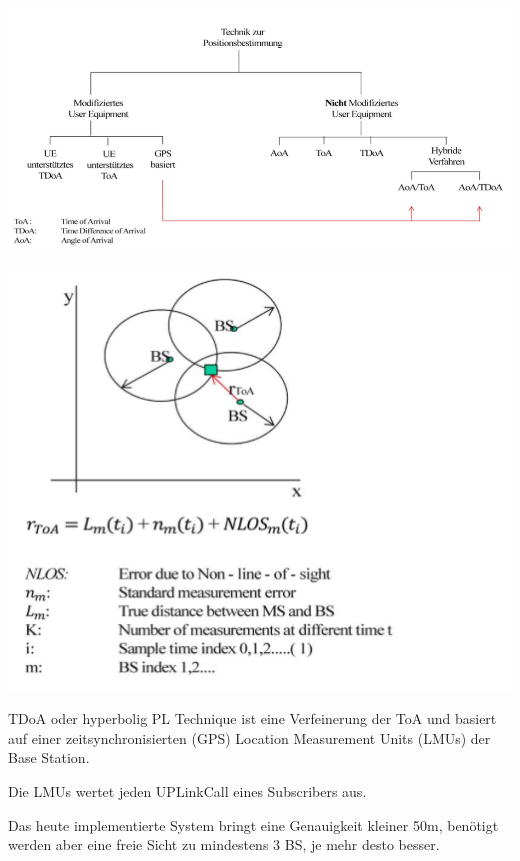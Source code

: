 \begin{minipage}{0.7 \linewidth}
\includegraphics[width =\linewidth]{./Pics/MPS}
\end{minipage}
\begin{minipage}{0.3 \linewidth}
\includegraphics[width = \linewidth]{./Pics/TDoA}
\end{minipage}

TDoA oder hyperbolig PL Technique ist eine Verfeinerung der ToA und basiert auf einer zeitsynchronisierten (GPS) Location Measurement Units (LMUs) der Base Station.

Die LMUs wertet jeden UPLinkCall eines Subscribers aus. 

Das heute implementierte System bringt eine Genauigkeit kleiner 50m, benötigt werden aber eine freie Sicht zu mindestens 3 BS, je mehr desto besser. 

